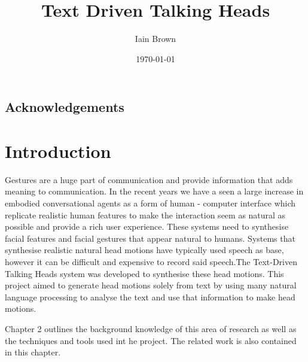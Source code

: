 \documentclass[bsc,frontabs,twoside,singlespacing,parskip]{infthesis}
\begin{document}
\title{Text Driven Talking Heads}

\author{Iain Brown}

\date{\today}
\maketitle
\section*{Acknowledgements}
\tableofcontents

\chapter{Introduction}

Gestures are a huge part of communication \cite{kendon} and provide information that adds meaning to communication. In the recent years we have a seen a large increase in embodied conversational agents as a form of human - computer interface which replicate realistic human features to make the interaction seem as natural as possible and provide a rich user experience. These systems need to synthesise facial features and facial gestures that appear natural to humans. Systems that synthesise realistic natural head motions have typically used speech as base, however it can be difficult and expensive to record said speech.The Text-Driven Talking Heads system was developed to synthesise these head motions. This project aimed to generate head motions solely from text by using many natural language processing to analyse the text and use that information to make head motions.

Chapter 2 outlines the background knowledge of this area of research as well as the techniques and tools used int he project. The related work is also contained in this chapter.
\end{document}
